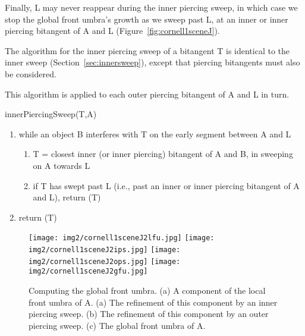 \documentclass[9pt,twocolumn]{article}
\newif\ifJournal
\begin{document}
Finally, L may never reappear during the inner piercing sweep, 
in which case we stop the global front umbra's growth as we sweep past L,
at an inner or inner piercing bitangent of A and L 
(Figure~\ref{fig:cornell1sceneJ}).
\fi

The algorithm for the inner piercing sweep of a bitangent T is 
identical to the inner sweep (Section~\ref{sec:innersweep}), 
except that piercing bitangents must also be considered.
\ifJournal
Interference is tested with the early segment rather than the segment between A and L,
which is subtly different than the inner sweep.
\fi
This algorithm is applied to each outer piercing bitangent of A and L in turn.

\vspace{.1in}

\centerline{innerPiercingSweep(T,A)}

\begin{enumerate}
\item while an object B interferes with T on the early segment between A and L
\begin{enumerate}
\item T = closest inner (or inner piercing) bitangent of A and B, 
      in sweeping on A towards L 
\item if T has swept past L (i.e., past an inner or inner piercing bitangent of A and L),
      return (T) %
\end{enumerate}
\item return (T)
\end{enumerate}

\begin{figure}
\begin{center}
\texttt{[image: img2/cornell1sceneJ2lfu.jpg]}
\texttt{[image: img2/cornell1sceneJ2ips.jpg]}
\texttt{[image: img2/cornell1sceneJ2ops.jpg]}
\texttt{[image: img2/cornell1sceneJ2gfu.jpg]}
\end{center}
\caption{Computing the global front umbra.
        (a) A component of the local front umbra of A.
        (a) The refinement of this component by an inner piercing sweep.
        (b) The refinement of this component by an outer piercing sweep.
	(c) The global front umbra of A.
}
\label{fig:globalfrontumbra}
\end{figure}
\end{document}
